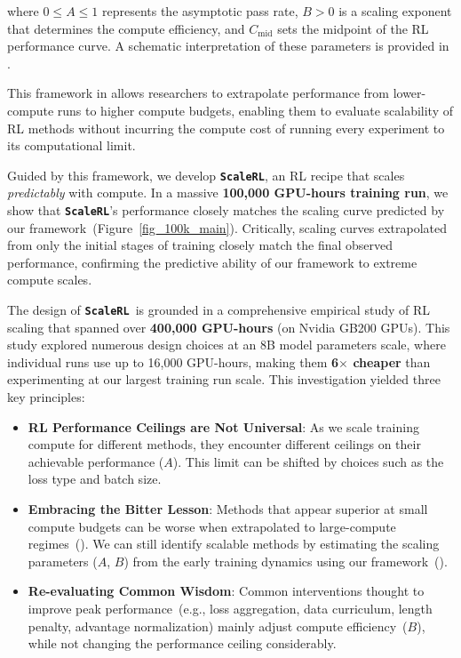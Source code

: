 \documentclass[]{fairmeta} %
\newcommand{\scalerl}{\texttt{\textbf{ScaleRL}}}
\begin{document}
where $0 \le A \le 1$ represents the asymptotic pass rate, $B > 0$ is a scaling exponent that determines the compute efficiency, and $C_\text{mid}$ sets the midpoint of the RL performance curve. A schematic interpretation of these parameters is provided in .

This framework in  allows researchers to extrapolate performance from lower-compute runs to higher compute budgets, enabling them to evaluate scalability of RL methods without incurring the compute cost of running every experiment to its computational limit.




Guided by this framework, we develop \scalerl, an RL recipe that scales \emph{predictably} with compute.
In a massive \textbf{100,000 GPU-hours training run},  we show that \scalerl's performance closely matches the scaling curve predicted by our framework~(Figure~\ref{fig_100k_main}). Critically, scaling curves extrapolated from only the initial stages of training closely match the final observed performance, confirming the predictive ability of our framework to extreme compute scales.


The design of \scalerl\ is grounded in a comprehensive empirical study of RL scaling that spanned over \textbf{400,000 GPU-hours} (on Nvidia GB200 GPUs). This study explored numerous design choices at an 8B model parameters scale, where individual runs use up to 16,000 GPU-hours, making them \textbf{6$\times$ cheaper} than experimenting at our largest training run scale. This investigation yielded three key principles:
\begin{itemize}[leftmargin=2em]
    \item \textbf{RL Performance Ceilings are Not Universal}: As we scale training compute for different methods, they encounter different ceilings on their achievable performance ($A$). This limit can be shifted by choices such as the loss type and batch size.
    \item \textbf{Embracing the Bitter Lesson}: Methods that appear superior at small compute budgets can be worse when extrapolated to large-compute regimes~(). We can still identify scalable methods by estimating the scaling parameters ($A$, $B$) from the early training dynamics using our framework~().
    \item \textbf{Re-evaluating Common Wisdom}: Common interventions thought to improve peak performance~(e.g., loss aggregation, data curriculum, length penalty, advantage normalization) mainly adjust compute efficiency~($B$), while not changing the performance ceiling considerably. 
\end{itemize}
\end{document}
